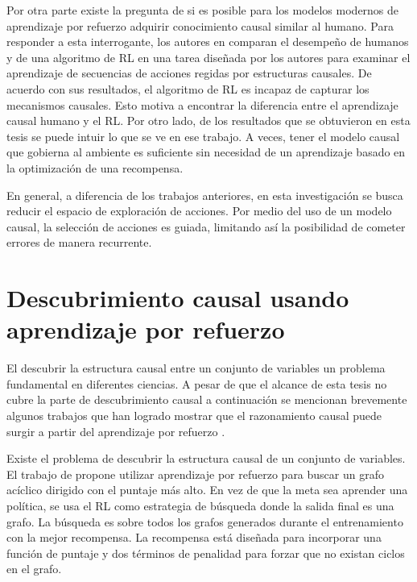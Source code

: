 Por otra parte existe la pregunta de si es posible para los modelos modernos de aprendizaje por refuerzo adquirir conocimiento causal similar al humano. Para responder a esta interrogante,  los autores en \cite{edmonds2018human} comparan el desempeño de humanos y de una algoritmo de RL en una tarea diseñada por los autores para examinar el aprendizaje de secuencias de acciones regidas por estructuras causales.  De acuerdo con sus resultados, el algoritmo de RL es incapaz de capturar los mecanismos causales. Esto motiva a encontrar la diferencia entre el aprendizaje causal humano y el RL. Por otro lado, de los resultados que se obtuvieron en esta tesis se puede intuir lo que se ve en ese trabajo. A veces, tener el modelo causal que gobierna al ambiente es suficiente sin necesidad de un aprendizaje basado en la optimización de una recompensa.

En general, a diferencia de los trabajos anteriores,
en esta investigación se busca reducir el espacio de exploración
de acciones. 
Por medio del uso de un modelo causal, la selección de acciones es guiada, limitando así la posibilidad de cometer errores de manera recurrente.

\section{Descubrimiento causal usando aprendizaje por refuerzo}

El descubrir la estructura causal entre un conjunto de variables un problema
fundamental en diferentes ciencias. A pesar de que 
el alcance de esta tesis no cubre la parte de descubrimiento causal 
a continuación se mencionan brevemente algunos trabajos 
que han logrado mostrar que el razonamiento causal puede surgir a partir del aprendizaje por refuerzo \cite{dasgupta2019causal, madumal2019explainable, zhu2019causal}. 


Existe el problema de descubrir la estructura causal de un conjunto de variables. El trabajo  de \cite{zhu2019causal} propone utilizar aprendizaje por refuerzo para buscar un grafo acíclico dirigido con el puntaje más alto. En vez de que la meta sea aprender una política, se usa el RL como estrategia de búsqueda donde la salida final es una grafo. La búsqueda es sobre todos los grafos generados durante el entrenamiento con la mejor recompensa. La recompensa está diseñada para incorporar una función de puntaje y dos términos de penalidad para forzar que no existan ciclos en el grafo.

